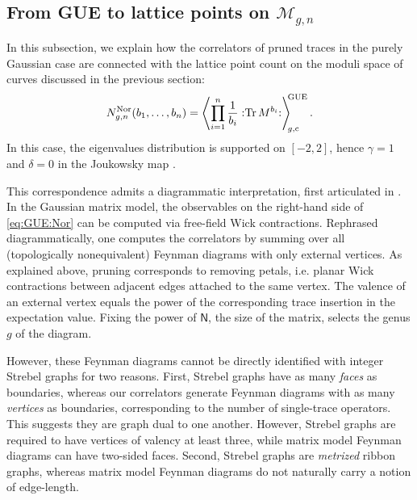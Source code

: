 \documentclass[a4paper,11pt,english]{article}
\theoremstyle{plain}
\theoremstyle{definition}
\theoremstyle{plain}
\newcommand{\cc}{\mathrm{c}}
\DeclareMathOperator{\Tr}{Tr}
\newcommand{\normord}[1]{:\mathrel{#1}:}
\newcommand{\NTr}[1]{\normord{\Tr{#1}}}
\newcommand{\ms}[1]{\mathsf{#1}}
\newcommand{\M}{\mathcal{M}}
\begin{document}
\subsection{From GUE to lattice points on \texorpdfstring{$\M_{g,n}$}{the moduli of curves}} 
\label{subsec:GUE:correl}
In this subsection, we explain how the correlators of pruned traces in the purely Gaussian case are connected with the lattice point count on the moduli space of curves discussed in the previous section:
\begin{equation} \label{eq:GUE:Nor}
    N^{\textup{Nor}}_{g,n}(b_1,\ldots,b_n)
    =
    \left\langle \prod_{i=1}^n \frac{1}{b_{i}} \NTr{M^{b_i}} \right\rangle_{\!\!g,\cc}^{\!\!\textup{GUE}} .
\end{equation}
In this case, the eigenvalues distribution is supported on $[-2,2]$, hence $\gamma = 1$ and $\delta = 0$ in the Joukowsky map .

This correspondence admits a diagrammatic interpretation, first articulated in \cite{Gop04a,Gop04b,Gop05}. In the Gaussian matrix model, the observables on the right-hand side of \cref{eq:GUE:Nor} can be computed via free-field Wick contractions. Rephrased diagrammatically, one computes the correlators by summing over all (topologically nonequivalent) Feynman diagrams with only external vertices. As explained above, pruning corresponds to removing petals, i.e. planar Wick contractions between adjacent edges attached to the same vertex. The valence of an external vertex equals the power of the corresponding trace insertion in the expectation value. Fixing the power of $\ms{N}$, the size of the matrix, selects the genus $g$ of the diagram.

However, these Feynman diagrams cannot be directly identified with integer Strebel graphs for two reasons. First, Strebel graphs have as many \emph{faces} as boundaries, whereas our correlators generate Feynman diagrams with as many \emph{vertices} as boundaries, corresponding to the number of single-trace operators. This suggests they are graph dual to one another. However, Strebel graphs are required to have vertices of valency at least three, while matrix model Feynman diagrams can have two-sided faces. Second, Strebel graphs are \emph{metrized} ribbon graphs, whereas matrix model Feynman diagrams do not naturally carry a notion of edge-length.
\end{document}

